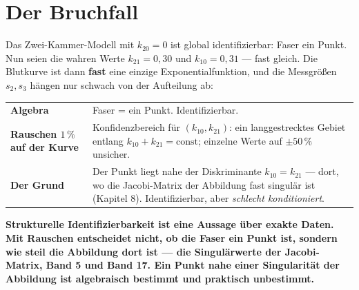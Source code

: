 \section{Der Bruchfall}

\begin{warnung}
Das Zwei-Kammer-Modell mit $k_{20} = 0$ ist global identifizierbar: Faser ein Punkt. Nun seien die wahren Werte $k_{21} = 0{,}30$ und $k_{10} = 0{,}31$ --- fast gleich. Die Blutkurve ist dann \textbf{fast} eine einzige Exponentialfunktion, und die Messgrößen $s_2, s_3$ hängen nur schwach von der Aufteilung ab:

\begin{center}
{\small
\renewcommand{\arraystretch}{1.5}
\begin{tabular}{@{}P{3.4cm}P{5.4cm}@{}}
\toprule
\textbf{Algebra} & Faser = ein Punkt. Identifizierbar.\\
\textbf{Rauschen $1\,\%$ auf der Kurve} & Konfidenzbereich für $(k_{10}, k_{21})$: ein langgestrecktes Gebiet entlang $k_{10} + k_{21} = \text{const}$; einzelne Werte auf $\pm50\,\%$ unsicher.\\
\textbf{Der Grund} & Der Punkt liegt nahe der Diskriminante $k_{10} = k_{21}$ --- dort, wo die Jacobi-Matrix der Abbildung fast singulär ist (Kapitel 8). Identifizierbar, aber \emph{schlecht konditioniert}.\\
\bottomrule
\end{tabular}}
\end{center}

\begin{center}
\begin{minipage}{0.9\textwidth}
\textbf{Strukturelle Identifizierbarkeit ist eine Aussage über exakte Daten. Mit Rauschen entscheidet nicht, ob die Faser ein Punkt ist, sondern wie steil die Abbildung dort ist --- die Singulärwerte der Jacobi-Matrix, Band 5 und Band 17. Ein Punkt nahe einer Singularität der Abbildung ist algebraisch bestimmt und praktisch unbestimmt.}
\end{minipage}
\end{center}

\begin{center}
\begin{minipage}{0.88\textwidth}
\end{minipage}
\end{center}
\end{warnung}

